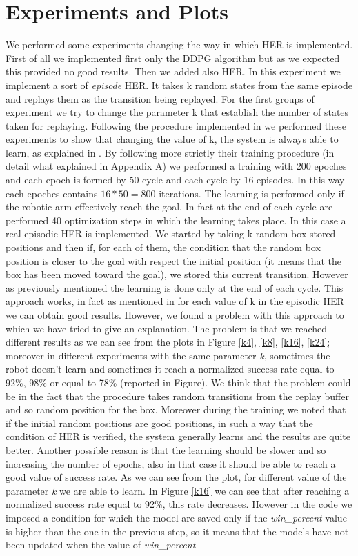\documentclass[a4paper]{report}
\begin{document}
\section{Experiments and Plots}
We performed some experiments changing the way in which HER is implemented.
First of all we implemented first only the DDPG algorithm but as we expected this provided no good results. Then we added also HER. In this experiment we implement a  sort of \textit{episode} HER. It takes k random states from the same episode and replays them as the transition being replayed. 
For the first groups of experiment we try to change the parameter k that establish the number of states taken for replaying. Following the procedure implemented in \cite{her} we performed these experiments to show that changing the value of k, the system is always able to learn, as explained in \cite{her}. By following more strictly their training procedure (in detail what explained in Appendix A) we performed a training with 200 epoches and each epoch is formed by 50 cycle and each cycle by 16 episodes. In this way each epoches contains $16 * 50=800$ iterations. The learning is performed only if the robotic arm effectively reach the goal. In fact at the end of each cycle are performed 40 optimization steps in which the learning takes place. In this case a real episodic HER is implemented. We started by taking k random box stored positions and then if, for each of them, the condition that the random box position is closer to the goal with respect the initial position (it means that the box has been moved toward the goal), we stored this current transition. However as previously mentioned the learning is done only at the end of each cycle. This approach works, in fact as mentioned in \cite{her} for each value of k in the episodic HER we can obtain good results. However, we found a problem with this approach to which we have tried to give an explanation. The problem is that we reached different results as we can see from the plots in Figure \ref{k4}, \ref{k8}, \ref{k16}, \ref{k24}; moreover in different experiments with the same parameter \textit{k}, sometimes the robot doesn't learn and sometimes it reach a normalized success rate equal to 92\%, 98\% or equal to 78\% (reported in Figure). We think that the problem could be in the fact that the procedure takes random transitions from the replay buffer and so random position for the box. Moreover during the training we noted that if the initial random positions are good positions, in such a way that the condition of HER is verified, the system generally learns and the results are quite better. Another possible reason is that the learning should be slower and so increasing the number of epochs, also in that case it should be able to reach a good value of success rate. As we can see from the plot, for different value of the parameter \textit{k} we are able to learn. In Figure \ref{k16} we can see that after reaching a normalized success rate equal to 92\%, this rate decreases. However in the code we imposed a condition for which the model are saved only if the \textit{win\_percent} value is higher than the one in the previous step, so it means that the models have not been updated when the value of \textit{win\_percent} 
\end{document}
